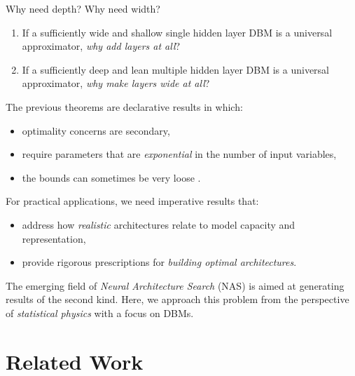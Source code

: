 \documentclass[8pt]{beamer}
\begin{document}
\begin{frame}[label={sec:org8b22640}]{Why need depth? Why need width?}
\begin{enumerate}
\item If a sufficiently wide and shallow single hidden layer DBM is a universal approximator, \emph{why add layers at all}?
\linebreak
\item If a sufficiently deep and lean multiple hidden layer DBM is a universal approximator, \emph{why make layers wide at all}?
\linebreak
\end{enumerate}
\linebreak
The previous theorems are \alert{declarative results} in which:
\begin{itemize}
\item optimality concerns are secondary,
\item require parameters that are \emph{exponential} in the number of input variables,
\item the bounds can sometimes be very loose \cite{bansal2018using}.
\linebreak
\end{itemize}
For practical applications, we need \alert{imperative results} that:
\begin{itemize}
\item address how \emph{realistic} architectures relate to model capacity and representation,
\item provide rigorous prescriptions for \emph{building optimal architectures}.
\linebreak
\end{itemize}
The emerging field of \emph{Neural Architecture Search} (NAS) \cite{ren2021comprehensive} is aimed at generating results of the second kind. Here, we approach this problem from the perspective of \emph{statistical physics} with a focus on DBMs.
\end{frame}

\section{Related Work}
\label{sec:org5622510}
\end{document}
